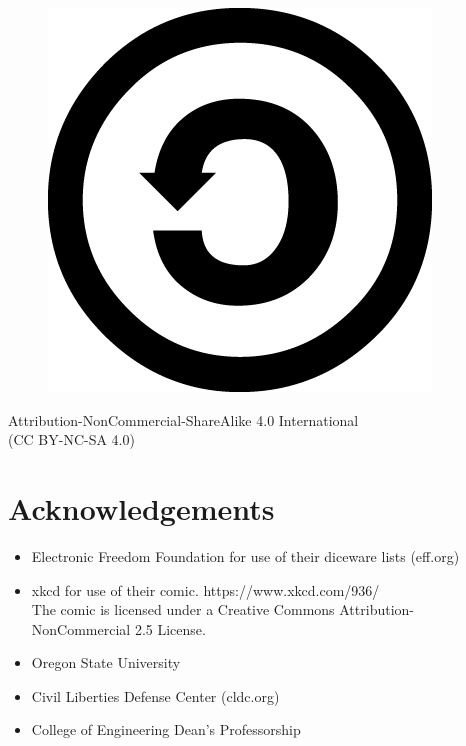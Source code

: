 \documentclass[12pt, oneside]{book}
\begin{document}
\begin{figure}[h]
	\includegraphics[scale=0.1]{sa.png}
\end{figure}
	Attribution-NonCommercial-ShareAlike 4.0 International\\ (CC BY-NC-SA 4.0)
	\section*{Acknowledgements}
	\begin{itemize}
		\item Electronic Freedom Foundation for use of their diceware lists (eff.org)\\
		\item xkcd for use of their comic. https://www.xkcd.com/936/\\
		The comic is licensed under a Creative Commons Attribution-NonCommercial 2.5 License.
		\item Oregon State University\\
		\item Civil Liberties Defense Center (cldc.org)\\
		\item College of Engineering Dean's Professorship\\
	\end{itemize}
	
\end{document}
